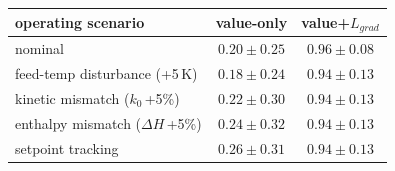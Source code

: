 \begin{tabular}{lcc}
\toprule
operating scenario & value-only & value+$L_{grad}$ \\
\midrule
nominal & $0.20\pm0.25$ & $0.96\pm0.08$ \\
feed-temp disturbance (+5\,K) & $0.18\pm0.24$ & $0.94\pm0.13$ \\
kinetic mismatch ($k_0$\,+5\%) & $0.22\pm0.30$ & $0.94\pm0.13$ \\
enthalpy mismatch ($\Delta H$\,+5\%) & $0.24\pm0.32$ & $0.94\pm0.13$ \\
setpoint tracking & $0.26\pm0.31$ & $0.94\pm0.13$ \\
\bottomrule
\end{tabular}